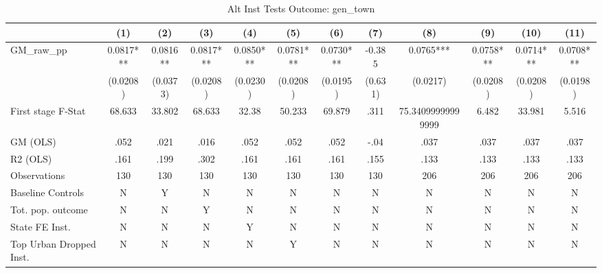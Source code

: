 \begin{table}[htbp]\centering
\def\sym#1{\ifmmode^{#1}\else\(^{#1}\)\fi}
\caption{Alt Inst Tests Outcome: gen\_town}
\begin{tabular}{l*{11}{c}}
\toprule
            &\multicolumn{1}{c}{(1)}   &\multicolumn{1}{c}{(2)}   &\multicolumn{1}{c}{(3)}   &\multicolumn{1}{c}{(4)}   &\multicolumn{1}{c}{(5)}   &\multicolumn{1}{c}{(6)}   &\multicolumn{1}{c}{(7)}   &\multicolumn{1}{c}{(8)}   &\multicolumn{1}{c}{(9)}   &\multicolumn{1}{c}{(10)}   &\multicolumn{1}{c}{(11)}   \\
\midrule
GM\_raw\_pp   &   0.0817***&   0.0816** &   0.0817***&   0.0850***&   0.0781***&   0.0730***&   -0.385   &   0.0765***&   0.0758***&   0.0714***&   0.0708***\\
            & (0.0208)   & (0.0373)   & (0.0208)   & (0.0230)   & (0.0208)   & (0.0195)   &  (0.631)   & (0.0217)   & (0.0208)   & (0.0208)   & (0.0198)   \\
\midrule
First stage F-Stat&   68.633   &   33.802   &   68.633   &    32.38   &   50.233   &   69.879   &     .311   &75.34099999999999   &    6.482   &   33.981   &    5.516   \\
GM (OLS)    &     .052   &     .021   &     .016   &     .052   &     .052   &     .052   &     -.04   &     .037   &     .037   &     .037   &     .037   \\
R2 (OLS)    &     .161   &     .199   &     .302   &     .161   &     .161   &     .161   &     .155   &     .133   &     .133   &     .133   &     .133   \\
Observations&      130   &      130   &      130   &      130   &      130   &      130   &      130   &      206   &      206   &      206   &      206   \\
Baseline Controls&        N   &        Y   &        N   &        N   &        N   &        N   &        N   &        N   &        N   &        N   &        N   \\
Tot. pop. outcome&        N   &        N   &        Y   &        N   &        N   &        N   &        N   &        N   &        N   &        N   &        N   \\
State FE Inst.&        N   &        N   &        N   &        Y   &        N   &        N   &        N   &        N   &        N   &        N   &        N   \\
Top Urban Dropped Inst.&        N   &        N   &        N   &        N   &        Y   &        N   &        N   &        N   &        N   &        N   &        N   \\

\end{tabular}
\end{table}
